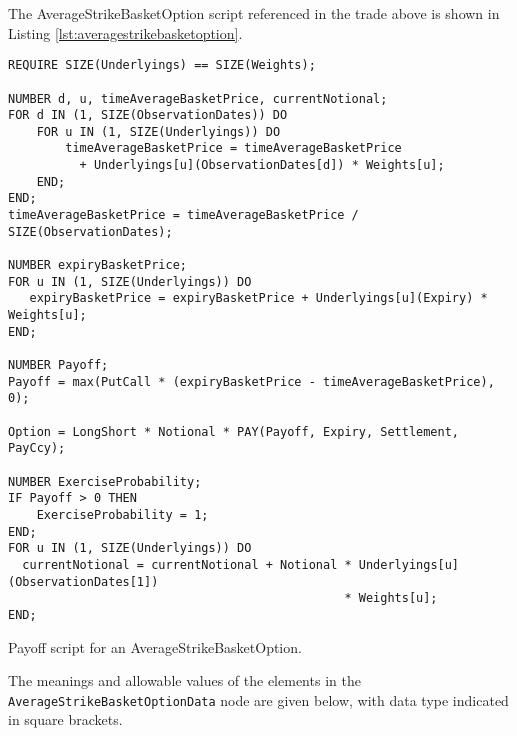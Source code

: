 The AverageStrikeBasketOption script referenced in the trade above is
shown in Listing \ref{lst:averagestrikebasketoption}.

\begin{listing}[hbt]
\begin{verbatim}
REQUIRE SIZE(Underlyings) == SIZE(Weights);

NUMBER d, u, timeAverageBasketPrice, currentNotional;
FOR d IN (1, SIZE(ObservationDates)) DO
    FOR u IN (1, SIZE(Underlyings)) DO
        timeAverageBasketPrice = timeAverageBasketPrice
          + Underlyings[u](ObservationDates[d]) * Weights[u];
    END;
END;
timeAverageBasketPrice = timeAverageBasketPrice / SIZE(ObservationDates);

NUMBER expiryBasketPrice;
FOR u IN (1, SIZE(Underlyings)) DO
   expiryBasketPrice = expiryBasketPrice + Underlyings[u](Expiry) * Weights[u];
END;

NUMBER Payoff;
Payoff = max(PutCall * (expiryBasketPrice - timeAverageBasketPrice), 0);

Option = LongShort * Notional * PAY(Payoff, Expiry, Settlement, PayCcy);

NUMBER ExerciseProbability;
IF Payoff > 0 THEN
    ExerciseProbability = 1;
END;
FOR u IN (1, SIZE(Underlyings)) DO
  currentNotional = currentNotional + Notional * Underlyings[u](ObservationDates[1])
                                               * Weights[u];
END;
\end{verbatim}
\caption{Payoff script for an AverageStrikeBasketOption.}
\label{lst:averagestrikebasketoption}
\end{listing}

The meanings and allowable values of the elements in the
\lstinline!AverageStrikeBasketOptionData! node are given below, with data
type indicated in square brackets.

